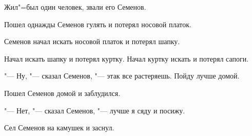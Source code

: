 Жил"=был один человек, звали его Семенов.

    Пошел  однажды  Семенов гулять и потерял
носовой платок.

    Семенов  начал  искать  носовой платок и
потерял шапку.

    Начал искать шапку и потерял куртку. Начал куртку искать и потерял сапоги.

     "---  Ну,  "---  сказал Семенов,  "---   этак все растеряешь. Пойду лучше домой.

    Пошел Семенов домой и заблудился.

     "---  Нет,  "---  сказал Семенов,  "---   лучше я сяду
и посижу.

    Сел Семенов на камушек и заснул.
